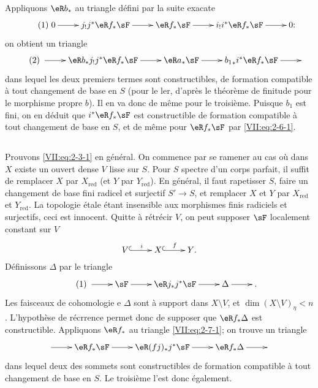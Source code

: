 Appliquons $\eR b_\ast$ au triangle d\'efini par la suite exacate 
\begin{equation*}\tag{1}\label{VII:eq:2-6-1}
\xymatrix{
  0 \ar[r] 
    & j_! j^\ast \eR f_\ast \sF \ar[r] 
    & \eR f_\ast \sF \ar[r] 
    & i_! i^\ast \eR f_\ast \sF \ar[r] 
    & 0 \text{:} 
}
\end{equation*}
on obtient un triangle 
\begin{equation*}\tag{2}\label{VII:eq:2-6-2}
\xymatrix{
  \ar[r] 
    & \eR b_\ast j_! j^\ast \eR f_\ast \sF \ar[r] 
    & \eR a_\ast \sF \ar[r] 
    & {b_1}_\ast i^\ast \eR f_\ast \sF \ar[r] 
    & 
}
\end{equation*}
dans lequel les deux premiers termes sont constructibles, de formation 
compatible \`a tout changement de base en $S$ (pour le ler, d'apr\`es le 
th\'eor\`eme de finitude pour le morphisme propre $b$). Il en va donc de 
m\^eme pour le troisi\`eme. Puisque $b_1$ est fini, on en d\'eduit que 
$i^\ast \eR f_\ast \sF$ est constructible de formation compatible \`a tout 
changement de base en $S$, et de m\^eme pour $\eR f_\ast \sF$ par 
\eqref{VII:eq:2-6-1}. 





\subsection{}\label{VII:2-7}

Prouvons \eqref{VII:eq:2-3-1} en g\'en\'eral. On commence par se ramener au cas 
o\`u dans $X$ existe un ouvert dense $V$ lisse sur $S$. Pour $S$ spectre d'un 
corps parfait, il suffit de remplacer $X$ par $X_\text{red}$ (et $Y$ par 
$Y_\text{red}$). En g\'en\'eral, il faut rapetisser $S$, faire un changement de 
base fini radicel et surjectif $S' \to S$, et remplacer $X$ et $Y$ par 
$X_\text{red}$ et $Y_\text{red}$. La topologie \'etale \'etant insensible aux 
morphismes finis radiciels et surjectifs, ceci est innocent. Quitte \`a 
r\'etr\'ecir $V$, on peut supposer $\sF$ localement constant sur $V$ 
\[\xymatrix{
  V \ar@{^{(}->}[r]^i 
    & X \ar@{^{(}->}[r]^-f 
    & Y \text{.} 
}\]
D\'efinissons $\Delta$ par le triangle 
\begin{equation*}\tag{1}\label{VII:eq:2-7-1}
\xymatrix{
  \ar[r] 
    & \sF \ar[r] 
    & \eR j_\ast j^\ast \sF \ar[r] 
    & \Delta \ar[r] 
    & \text{.} 
}
\end{equation*}
Les faisceaux de cohomologie e $\Delta$ sont \`a support dans $X\setminus V$, 
et $\dim(X\setminus V)_\eta < n$. L'hypoth\`ese de r\'ecrrence permet donc de 
supposer que $\eR f_\ast \Delta$ est constructible. Appliquons $\eR f_\ast$ au 
triangle \eqref{VII:eq:2-7-1}; on trouve un triangle 
\[\xymatrix{
  \ar[r] 
    & \eR f_\ast \sF \ar[r] 
    & \eR(f j)_\ast j^\ast \sF \ar[r] 
    & \eR f_\ast \Delta \ar[r] 
    & 
}\]
dans lequel deux des sommets sont constructibles de formation compatible \`a 
tout changement de base en $S$. Le troisi\`eme l'est donc \'egalement. 





